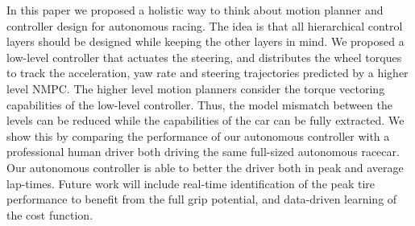 In this paper we proposed a holistic way to think about motion planner and controller design for autonomous racing.
The idea is that all hierarchical control layers should be designed while keeping the other layers in mind.
We proposed a low-level controller that actuates the steering, and distributes the wheel torques to track the acceleration, yaw rate and steering trajectories predicted by a higher level NMPC.
The higher level motion planners consider the torque vectoring capabilities of the low-level controller. Thus, the model mismatch between the levels can be reduced while the capabilities of the car can be fully extracted. 
We show this by comparing the performance of our autonomous controller with a professional human driver both driving the same full-sized autonomous racecar. 
Our autonomous controller is able to better the driver both in peak and average lap-times. Future work will include real-time identification of the peak tire performance to benefit from the full grip potential, and data-driven learning of the cost function. 
